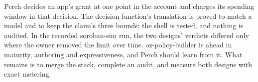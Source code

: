Perch decides an app's grant at one point in the account and charges its
spending window in that decision. The decision function's translation is proved
to match a model and to keep the claim's three bounds; the shell is tested, and
nothing is audited. In the recorded soroban-sim run, the two designs' verdicts differed
only where the owner removed the limit over time. oz-policy-builder is ahead in
maturity, authoring and expressiveness, and Perch should learn from it. What
remains is to merge the stack, complete an audit, and measure both designs with
exact metering.
